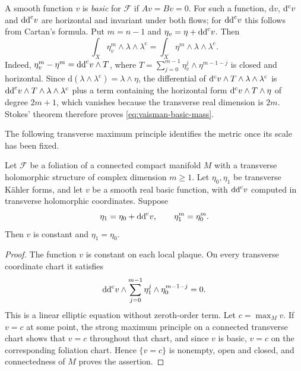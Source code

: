 A smooth function $v$ is \emph{basic} for $\mathcal F$ if $Av=Bv=0$. For such a function, $\mathrm{d}v$, $\mathrm d^{\mathrm c} v$ and $\mathrm{dd}^{\mathrm{c}} v$ are horizontal and invariant under both flows; for $\mathrm{dd}^{\mathrm{c}} v$ this follows from Cartan's formula. Put $m=n-1$ and $\eta_v=\eta+\mathrm{dd}^{\mathrm{c}} v$. Then
\begin{equation}\label{eq:vaisman-basic-mass}
 \int_X\eta_v^m\wedge\lambda\wedge\lambda^{\mathrm c}
 =\int_X\eta^m\wedge\lambda\wedge\lambda^{\mathrm c}.
\end{equation}
Indeed, $\eta_v^m-\eta^m=\mathrm{dd}^{\mathrm{c}} v\wedge T$, where $T=\sum_{j=0}^{m-1}\eta_v^j\wedge\eta^{m-1-j}$ is closed and horizontal. Since $\mathrm{d}(\lambda\wedge\lambda^{\mathrm c})=\lambda\wedge\eta$, the differential of $\mathrm d^{\mathrm c} v\wedge T\wedge\lambda\wedge\lambda^{\mathrm c}$ is $\mathrm{dd}^{\mathrm{c}} v\wedge T\wedge\lambda\wedge\lambda^{\mathrm c}$ plus a term containing the horizontal form $\mathrm d^{\mathrm c} v\wedge T\wedge\eta$ of degree $2m+1$, which vanishes because the transverse real dimension is $2m$. Stokes' theorem therefore proves \eqref{eq:vaisman-basic-mass}.

The following transverse maximum principle identifies the metric once its scale has been fixed.

\begin{proposition}\label{prop:lck-basic-uniqueness}
Let $\mathcal F$ be a foliation of a connected compact manifold $M$ with a transverse holomorphic structure of complex dimension $m\geq1$. Let $\eta_0,\eta_1$ be transverse K\"ahler forms, and let $v$ be a smooth real basic function, with $\mathrm{dd}^{\mathrm{c}} v$ computed in transverse holomorphic coordinates. Suppose
\[
 \eta_1=\eta_0+\mathrm{dd}^{\mathrm{c}} v,
 \qquad \eta_1^m=\eta_0^m.
\]
Then $v$ is constant and $\eta_1=\eta_0$.
\end{proposition}
\begin{proof}
The function $v$ is constant on each local plaque. On every transverse coordinate chart it satisfies
\[
 \mathrm{dd}^{\mathrm{c}} v\wedge\sum_{j=0}^{m-1}\eta_1^j\wedge\eta_0^{m-1-j}=0.
\]
This is a linear elliptic equation without zeroth-order term. Let $c=\max_Mv$. If $v=c$ at some point, the strong maximum principle on a connected transverse chart shows that $v=c$ throughout that chart, and since $v$ is basic, $v=c$ on the corresponding foliation chart. Hence $\{v=c\}$ is nonempty, open and closed, and connectedness of $M$ proves the assertion.
\end{proof}


